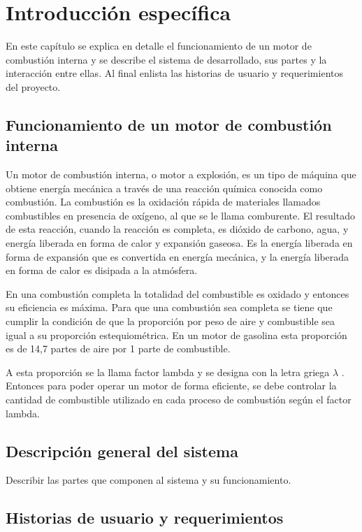 \chapter{Introducción específica} %

\label{Chapter2}

En este capítulo se explica en detalle el funcionamiento de un motor de combustión interna y se describe el sistema de desarrollado, sus partes y la interacción entre ellas. Al final enlista las historias de usuario y requerimientos del proyecto.

\section{Funcionamiento de un motor de combustión interna}

Un motor de combustión interna, o motor a explosión, es un tipo de máquina que obtiene energía mecánica a través de una reacción química conocida como combustión. La combustión es la oxidación rápida de materiales llamados combustibles en presencia de oxígeno, al que se le llama comburente. El resultado de esta reacción, cuando la reacción es completa, es dióxido de carbono, agua, y energía liberada en forma de calor y expansión gaseosa. Es la energía liberada en forma de expansión que es convertida en energía mecánica, y la energía liberada en forma de calor es disipada a la atmósfera.

En una combustión completa la totalidad del combustible es oxidado y entonces su eficiencia es máxima. Para que una combustión sea completa se tiene que cumplir la condición de que la proporción por peso de aire y combustible sea igual a su proporción estequiométrica. En un motor de gasolina esta proporción es de 14,7 partes de aire por 1 parte de combustible.

A esta proporción se la llama factor lambda y se designa con la letra griega $\lambda$ . Entonces para poder operar un motor de forma eficiente, se debe controlar la cantidad de combustible utilizado en cada proceso de combustión según el factor lambda.

\section{Descripción general del sistema}

Describir las partes que componen al sistema y su funcionamiento.

\section{Historias de usuario y requerimientos}

